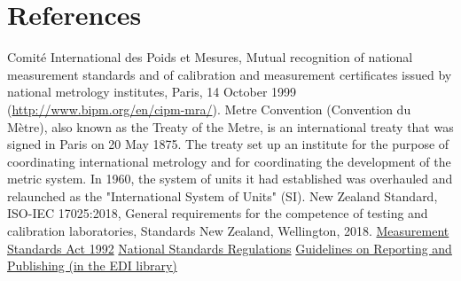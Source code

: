 \section{References}

\begingroup
\renewcommand{\section}[2]{}%

\begin{thebibliography}{9}
 Comit\'e International des Poids et Mesures, Mutual recognition of national measurement standards and of calibration and measurement certificates issued by national metrology institutes, Paris, 14 October 1999 (\url{http://www.bipm.org/en/cipm-mra/}).
 Metre Convention (Convention du M\`etre), also known as the Treaty of the Metre, is an international treaty that was signed in Paris on 20 May 1875. The treaty set up an institute for the purpose of coordinating international metrology and for coordinating the development of the metric system. In 1960, the system of units it had established was overhauled and relaunched as the "International System of Units" (SI).
 New Zealand Standard, ISO-IEC 17025:2018, General requirements for the competence of testing and calibration laboratories, Standards New Zealand, Wellington, 2018.
 \href{http://www.legislation.govt.nz/act/public/1992/0052/latest/whole.html}{Measurement Standards Act 1992}
 \href{http://www.legislation.govt.nz/regulation/public/2019/0091/latest/whole.html}{National Standards Regulations}
  \href{https://edi.callaghaninnovation.govt.nz/ws/msl/QMS/QM/Guidelines%20on%20Measurement%20Uncertainty.docx?Web=1}{Guidelines on Reporting and Publishing (in the EDI library)}
\end{thebibliography}

\endgroup